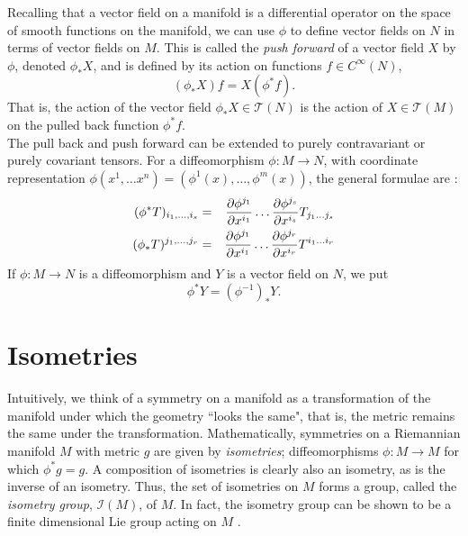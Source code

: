 
Recalling that a vector field on a manifold is a differential operator on the space of smooth functions on the manifold, we can use $\phi$ to define vector fields on $N$ in terms of vector fields on $M$. This is called the \textit{push forward} of a vector field $X$ by $\phi$, denoted $\phi_{*}X$, and is defined by its action on functions $f\in C^\infty(N)$,
\begin{equation} (\phi_{*}X)f = X(\phi^* f).\label{eq:pushforward} \end{equation}
That is, the action of the vector field $\phi_* X \in \mathcal{T}(N)$ is the action of $X\in \mathcal{T}(M)$ on the pulled back function $\phi^* f$. \\

The pull back and push forward can be extended to purely contravariant or purely covariant tensors. For a diffeomorphism $\phi:M\rightarrow N$, with coordinate representation $\phi(x^1,\dots x^n)=(\phi^1(x),\dots,\phi^m(x))$, the general formulae are \cite{Carroll}:
\begin{eqnarray}
(\phi^*T)_{i_1,\dots,i_s}&=& \frac{{\partial} \phi^{j_1}}{{\partial} x^{i_1}}\dots\frac{{\partial} \phi^{j_s}}{{\partial} x^{i_s}}T_{j_1\dots j_s}\label{eq:pullbackcov}\\
(\phi_*T)^{j_1,\dots,j_r}&=& \frac{{\partial} \phi^{j_1}}{{\partial} x^{i_1}}\dots\frac{{\partial} \phi^{j_r}}{{\partial} x^{i_r}}T^{i_1\dots i_r}\label{eq:pushforwardcontra}
\end{eqnarray}
If $\phi:M\rightarrow N$ is a diffeomorphism and $Y$ is a vector field on $N$, we put
\begin{equation} \phi^* Y = (\phi^{-1})_* Y. \label{eq:invpush}\end{equation}

\section{Isometries}\label{sec:Isometries}
Intuitively, we think of a symmetry on a manifold as a transformation of the manifold under which the geometry ``looks the same", that is, the metric remains the same under the transformation. Mathematically, symmetries on a Riemannian manifold $M$ with metric $g$ are given by \textit{isometries}; diffeomorphisms $\phi: M\rightarrow M$ for which $\phi^*g = g$. A composition of isometries is clearly also an isometry, as is the inverse of an isometry. Thus, the set of isometries on $M$ forms a group, called the \textit{isometry group}, $\mathcal{I}(M)$, of $M$. In fact, the isometry group can be shown to be a finite dimensional Lie group acting on $M$ \cite{Lee}. \\

